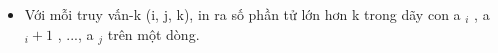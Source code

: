 \begin{itemize}
	\item     Với mỗi truy vấn-k (i, j, k), in ra số phần tử lớn hơn k trong dãy con a    $_     i    $    ,   a    $_     i+1    $    , ..., a    $_     j    $    trên một dòng.    


\end{itemize}